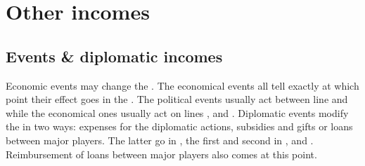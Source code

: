 \section{Other incomes}\label{chIncomes:OtherIncomes}
\subsection{Events \& diplomatic incomes}
\aparag Economic events may change the \RT. The economical events all
tell exactly at which point their effect goes in the \EcoRS. The
political events usually act between line  and
 while the economical ones usually act on lines
,  and .
\aparag Diplomatic events modify the \RT in two ways: expenses for the
diplomatic actions, subsidies and gifts or loans between major players.
The latter go in , the
first and second in ,
 and . Reimbursement of loans between major players also comes at
this point.

